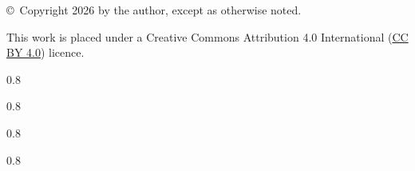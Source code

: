 \documentclass[11pt,onecolumn,twoside]{report}
\newcommand{\thisyear}{2026}         %
\renewcommand{\lstlistlistingname}{List of Listings}
\begin{document}
\begin{titlepage}
\vfill

\begin{center}
{\footnotesize\sffamily \copyright~Copyright \thisyear{} by the author,
except as otherwise noted.}

\vspace{2mm}
{\footnotesize\sffamily This work is placed under a
Creative Commons Attribution 4.0 International
(\href{https://creativecommons.org/licenses/by/4.0/}{CC BY 4.0}) licence.}
\end{center}

\end{titlepage}




\cleardoublepage
\pagestyle{plain}             %


\begin{spacing}{0.8}
\tableofcontents
\end{spacing}

\cleardoublepage
\begin{spacing}{0.8}
\listoffigures
\end{spacing}

\cleardoublepage
\begin{spacing}{0.8}
\listoftables
\end{spacing}

\cleardoublepage
\begin{spacing}{0.8}
\renewcommand{\lstlistlistingname}{List of Listings}
\lstlistoflistings
\end{spacing}



\cleardoublepage
\pagestyle{main}              %


\cleardoublepage


\cleardoublepage


\cleardoublepage


\appendix
\cleardoublepage


\cleardoublepage


\cleardoublepage
\printbibliography[heading=bibintoc]
\end{document}
